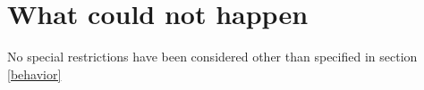 \section{What could not happen}
No special restrictions have been considered other than specified  in section \ref{behavior}
